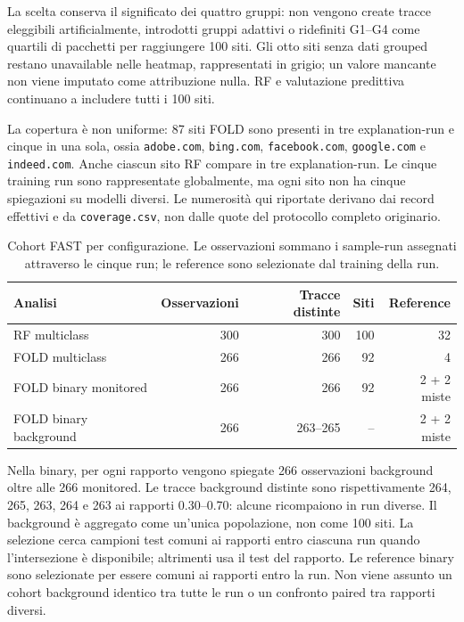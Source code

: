 \documentclass[11pt,a4paper]{article}
\begin{document}
La scelta conserva il significato dei quattro gruppi: non vengono create tracce eleggibili artificialmente, introdotti gruppi adattivi o ridefiniti G1--G4 come quartili di pacchetti per raggiungere 100 siti. Gli otto siti senza dati grouped restano unavailable nelle heatmap, rappresentati in grigio; un valore mancante non viene imputato come attribuzione nulla. RF e valutazione predittiva continuano a includere tutti i 100 siti.

La copertura è non uniforme: 87 siti FOLD sono presenti in tre explanation-run e cinque in una sola, ossia \texttt{adobe.com}, \texttt{bing.com}, \texttt{facebook.com}, \texttt{google.com} e \texttt{indeed.com}. Anche ciascun sito RF compare in tre explanation-run. Le cinque training run sono rappresentate globalmente, ma ogni sito non ha cinque spiegazioni su modelli diversi. Le numerosità qui riportate derivano dai record effettivi e da \texttt{coverage.csv}, non dalle quote del protocollo completo originario.

\begin{table}[htbp]
\centering\footnotesize
\caption{Cohort FAST per configurazione. Le osservazioni sommano i sample-run assegnati attraverso le cinque run; le reference sono selezionate dal training della run.}
\label{tab:crossrun-cohorts}
\begin{tabular}{lrrrr}
\toprule
Analisi & Osservazioni & Tracce distinte & Siti & Reference \\
\midrule
RF multiclass & 300 & 300 & 100 & 32 \\
FOLD multiclass & 266 & 266 & 92 & 4 \\
FOLD binary monitored & 266 & 266 & 92 & 2 + 2 miste \\
FOLD binary background & 266 & 263--265 & -- & 2 + 2 miste \\
\bottomrule
\end{tabular}
\end{table}

Nella binary, per ogni rapporto vengono spiegate 266 osservazioni background oltre alle 266 monitored. Le tracce background distinte sono rispettivamente 264, 265, 263, 264 e 263 ai rapporti 0.30--0.70: alcune ricompaiono in run diverse. Il background è aggregato come un'unica popolazione, non come 100 siti. La selezione cerca campioni test comuni ai rapporti entro ciascuna run quando l'intersezione è disponibile; altrimenti usa il test del rapporto. Le reference binary sono selezionate per essere comuni ai rapporti entro la run. Non viene assunto un cohort background identico tra tutte le run o un confronto paired tra rapporti diversi.
\end{document}
